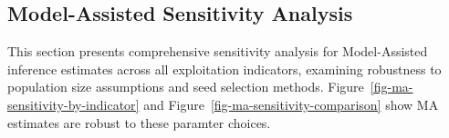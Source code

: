 \documentclass[
  12pt,
  letterpaper,
  DIV=11,
  numbers=noendperiod]{scrartcl}
\theoremstyle{plain}
\theoremstyle{definition}
\begin{document}
\begin{table}
{}

\end{table}%

\subsection{Model-Assisted Sensitivity
Analysis}\label{model-assisted-sensitivity-analysis}

This section presents comprehensive sensitivity analysis for
Model-Assisted inference estimates across all exploitation indicators,
examining robustness to population size assumptions and seed selection
methods. Figure~\ref{fig-ma-sensitivity-by-indicator} and
Figure~\ref{fig-ma-sensitivity-comparison} show MA estimates are robust
to these paramter choices.

\begin{table}

\caption{\label{tbl-ma-sensitivity-full}Model-Assisted Sensitivity
Analysis: Point estimates and 95\% credible intervals across all
parameter combinations. Estimates from Gile \& Handcock (2015) Bayesian
Model-Assisted inference.}

\centering{

\begingroup\fontsize{7}{9}\selectfont

}
\end{table}
\end{document}
